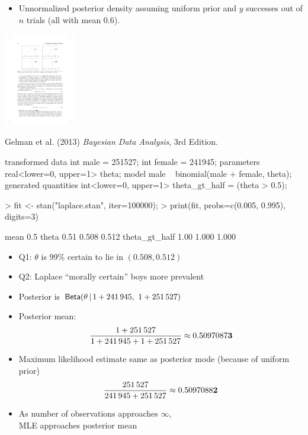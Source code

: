 \documentclass[10pt]{report}
\begin{document}
%
\vspace*{-4pt}
\begin{itemize}
\item Unnormalized posterior density assuming uniform prior and $y$
  successes out of $n$ trials (all with mean 0.6).
\end{itemize}
\begin{center}
\includegraphics[height=1.6in]{img/bda-beta-plots.pdf}
\end{center}
\vspace*{-12pt}
\hfill {\tiny Gelman et al. (2013) {\slshape Bayesian Data Analysis},
  3rd Edition.}


%
\begin{stancode}
transformed data {
  int male = 251527;
  int female = 241945;
}
parameters {
  real<lower=0, upper=1> theta;
}
model {
  male ~ binomial(male + female, theta);
}
generated quantities {
  int<lower=0, upper=1> theta_gt_half = (theta > 0.5);
}
\end{stancode}


%
\begin{codein}
> fit <- stan("laplace.stan", iter=100000);
> print(fit, probs=c(0.005, 0.995), digits=3)
\end{codein}
\begin{codeout}
                    mean   0.5%
theta               0.51  0.508  0.512
theta_gt_half       1.00  1.000  1.000
\end{codeout}
%
\begin{itemize}
\item Q1: $\theta$ is 99\% certain to lie in $(0.508, 0.512)$
%
\item Q2:  Laplace ``morally certain'' boys more prevalent
\end{itemize}


%
\begin{itemize}
\item Posterior is $\text{\sf Beta}(\theta \, | \, 1 + 241\,945, \ 1 + 251\,527)$
\item Posterior mean:
\[
\frac{1 + 251\,527}
     {1 + 241\,945 + 1 + 251\,527}
\approx 0.5097087{\bf3}
\]
\item Maximum likelihood estimate same as posterior mode (because
  of uniform prior)
\[
\frac{251\,527}
     {241\,945 + 251\,527}
\approx 0.5097088{\bf2}
\]
\item As number of observations approaches $\infty$,
\\
MLE approaches posterior mean
\end{itemize}
\end{document}
